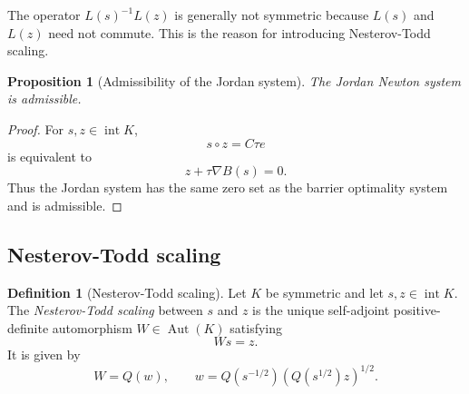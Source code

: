\documentclass[a4paper,11pt]{book}
\theoremstyle{plain}
\newtheorem{proposition}[theorem]{Proposition}
\theoremstyle{definition}
\newtheorem{definition}[theorem]{Definition}
\theoremstyle{remark}
\numberwithin{equation}{chapter}
\numberwithin{algorithm}{chapter}
\newcommand{\intr}{\operatorname{int}}
\newcommand{\Aut}{\operatorname{Aut}}
\begin{document}
	The operator \(L(s)^{-1}L(z)\) is generally not symmetric because
	\(L(s)\) and \(L(z)\) need not commute. This is the reason for introducing
	Nesterov-Todd scaling.
	
	\begin{proposition}[Admissibility of the Jordan system]
		The Jordan Newton system is admissible.
	\end{proposition}
	
	\begin{proof}
		For \(s,z\in\intr K\),
		\[
		s\circ z=C\tau e
		\]
		is equivalent to
		\[
		z+\tau\nabla B(s)=0.
		\]
		Thus the Jordan system has the same zero set as the barrier optimality
		system and is admissible.
	\end{proof}
	
	\subsection{Nesterov-Todd scaling}
	
	\begin{definition}[Nesterov-Todd scaling]
		Let \(K\) be symmetric and let \(s,z\in\intr K\). The
		\emph{Nesterov-Todd scaling} between \(s\) and \(z\) is the unique
		self-adjoint positive-definite automorphism \(W\in\Aut(K)\) satisfying
		\[
		Ws=z.
		\]
		It is given by
		\begin{equation}
			W=Q(w),
			\qquad
			w
			=
			Q(s^{-1/2})
			\left(
			Q(s^{1/2})z
			\right)^{1/2}.
		\end{equation}
	\end{definition}
	
\end{document}

